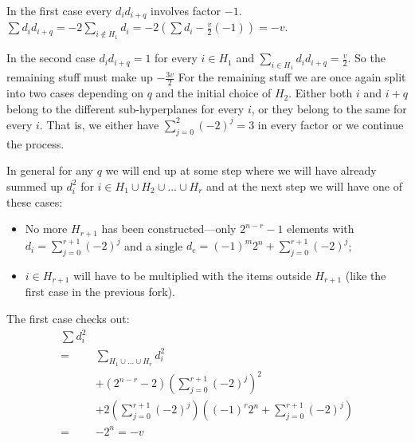         In the first case every $d_i d_{i+q}$ involves factor $-1$. $\sum d_i d_{i+q} = -2\sum\limits_{i\notin H_1} d_i = -2 (\sum d_i - \frac v2 (-1)) = -v$.
        
        In the second case $d_i d_{i+q} = 1$ for every $i \in H_1$ and $\sum\limits_{i \in H_1} d_i d_{i+q} = \frac v2$. So the remaining stuff must make up $-\frac {3v}2$ For the remaining stuff we are once again split into two cases depending on $q$ and the initial choice of $H_2$. Either both $i$ and $i+q$ belong to the different sub-hyperplanes for every $i$, or they belong to the same for every $i$. That is, we either have $\sum\limits_{j=0}^2 (-2)^j = 3$ in every factor or we continue the process.
        
        In general for any $q$ we will end up at some step where we will have already summed up $d_i^2$ for $i \in H_1 \cup H_2 \cup \ldots \cup H_r$ and at the next step we will have one of these cases:
        
        \begin{itemize}
            \item No more $H_{r+1}$ has been constructed---only $2^{n-r}-1$ elements with $d_i = \sum\limits_{j=0}^{r+1} (-2)^j$ and a single $d_e = (-1)^m 2^n + \sum\limits_{j=0}^{r+1} (-2)^j$;
            \item $i \in H_{r+1}$ will have to be multiplied with the items outside $H_{r+1}$ (like the first case in the previous fork).
        \end{itemize}

        The first case checks out:
        \begin{equation}
            \begin{split}
                \sum d_i^2 & \\
                = & \sum\limits_{H_1 \cup \ldots \cup H_r} d_i^2 \\
                & + (2^{n-r}-2) \left(\sum\limits_{j=0}^{r+1} (-2)^j \right)^2 \\
                & + 2 \left(\sum\limits_{j=0}^{r+1} (-2)^j \right) \left( (-1)^r 2^n + \sum\limits_{j=0}^{r+1} (-2)^j \right) \\
                = & - 2^n = -v
            \end{split}
        \end{equation}
    
